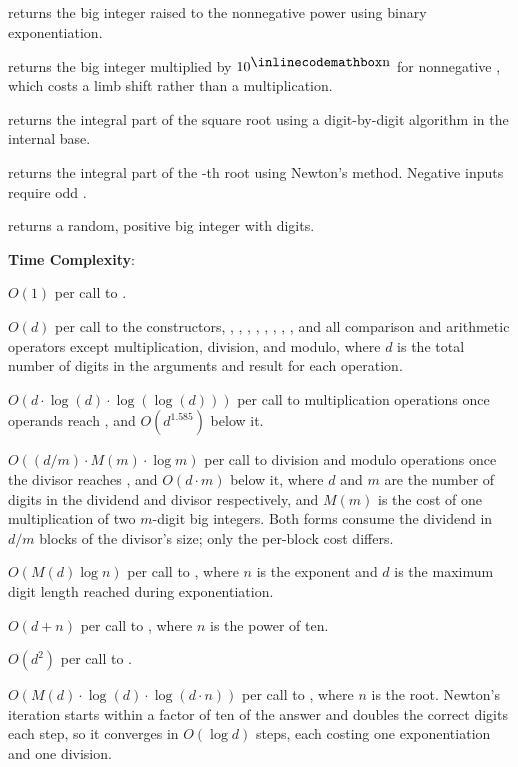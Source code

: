 \begin{compactitem}
  \item {} returns the big integer raised to the nonnegative power  using binary exponentiation.
  \item {} returns the big integer multiplied by $10^{{\inlinecodemath{n}}}$ for nonnegative , which costs a limb shift rather than a multiplication.
  \item {} returns the integral part of the square root using a digit-by-digit algorithm in the internal base.
  \item {} returns the integral part of the -th root using Newton's method. Negative inputs require odd .
  \item {} returns a random, positive big integer with  digits.
\end{compactitem}

\textbf{Time Complexity}:
\begin{compactitem}
  \item $O(1)$ per call to .
  \item $O(d)$ per call to the constructors, , , , , , , , , and all comparison and arithmetic operators except multiplication, division, and modulo, where $d$ is the total number of digits in the arguments and result for each operation.
  \item $O(d \cdot \log\left(d\right) \cdot \log\left(\log\left(d\right)\right))$ per call to multiplication operations once operands reach , and $O(d^{1.585})$ below it.
  \item $O((d/m) \cdot M(m) \cdot \log m)$ per call to division and modulo operations once the divisor reaches , and $O(d \cdot m)$ below it, where $d$ and $m$ are the number of digits in the dividend and divisor respectively, and $M(m)$ is the cost of one multiplication of two $m$-digit big integers. Both forms consume the dividend in $d/m$ blocks of the divisor's size; only the per-block cost differs.
  \item $O(M(d) \log n)$ per call to , where $n$ is the exponent and $d$ is the maximum digit length reached during exponentiation.
  \item $O(d + n)$ per call to , where $n$ is the power of ten.
  \item $O(d^{2})$ per call to .
  \item $O(M(d) \cdot \log\left(d\right) \cdot \log\left(d \cdot n\right))$ per call to , where $n$ is the root. Newton's iteration starts within a factor of ten of the answer and doubles the correct digits each step, so it converges in $O(\log d)$ steps, each costing one exponentiation and one division.
\end{compactitem}

